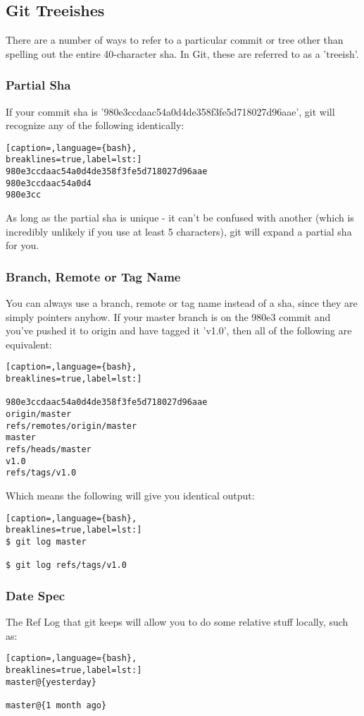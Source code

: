 \subsection{Git Treeishes}
There are a number of ways to refer to a particular commit or tree other than
spelling out the entire 40-character sha. In Git, these are referred to as a
'treeish'.

\subsubsection{Partial Sha}
If your commit sha is '980e3ccdaac54a0d4de358f3fe5d718027d96aae', git will
recognize any of the following identically:
\lstset{basicstyle=\scriptsize, numbers=none, captionpos=b, tabsize=4}
\begin{lstlisting}[caption=,language={bash},
breaklines=true,label=lst:]
980e3ccdaac54a0d4de358f3fe5d718027d96aae
980e3ccdaac54a0d4
980e3cc
\end{lstlisting}

As long as the partial sha is unique - it can't be confused with another (which
is incredibly unlikely if you use at least 5 characters), git will expand a
partial sha for you.

\subsubsection{Branch, Remote or Tag Name}
You can always use a branch, remote or tag name instead of a sha, since they
are simply pointers anyhow. If your master branch is on the 980e3 commit and
you've pushed it to origin and have tagged it 'v1.0', then all of the following
are equivalent:
\lstset{basicstyle=\scriptsize, numbers=none, captionpos=b, tabsize=4}
\begin{lstlisting}[caption=,language={bash},
breaklines=true,label=lst:]

980e3ccdaac54a0d4de358f3fe5d718027d96aae
origin/master
refs/remotes/origin/master
master
refs/heads/master
v1.0
refs/tags/v1.0
\end{lstlisting}

Which means the following will give you identical output:
\lstset{basicstyle=\scriptsize, numbers=none, captionpos=b, tabsize=4}
\begin{lstlisting}[caption=,language={bash},
breaklines=true,label=lst:]
$ git log master

$ git log refs/tags/v1.0
\end{lstlisting}

\subsubsection{Date Spec}
The Ref Log that git keeps will allow you to do some relative stuff locally,
such as:
\lstset{basicstyle=\scriptsize, numbers=none, captionpos=b, tabsize=4}
\begin{lstlisting}[caption=,language={bash},
breaklines=true,label=lst:]
master@{yesterday}

master@{1 month ago}
\end{lstlisting}

